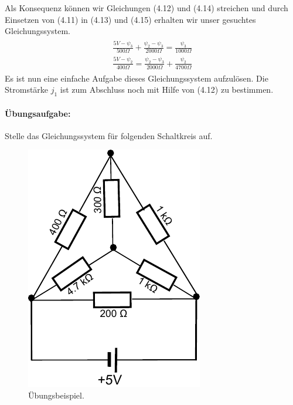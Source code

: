 \documentclass[11pt,a4paper,leqno]{report}
\numberwithin{equation}{chapter}
\begin{document}
Als Konsequenz k\"onnen wir Gleichungen (4.12) und (4.14) streichen und durch Einsetzen von (4.11) in (4.13) und (4.15) erhalten wir unser gesuchtes Gleichungssystem.
\begin{align} 
\begin{split}
\frac{5V - \psi_3}{500\Omega} + \frac{\psi_2 - \psi_3}{2000\Omega} = \frac{ \psi_3}{1000\Omega}\\
\frac{5V - \psi_2}{400\Omega} = \frac{\psi_2 - \psi_3}{2000\Omega} + \frac{ \psi_2}{4700\Omega}
\end{split}
\end{align}
Es ist nun eine einfache Aufgabe dieses Gleichungssystem aufzul\"osen. Die Stromst\"arke $j_1$ ist zum Abschluss noch mit Hilfe von (4.12) zu bestimmen.
\paragraph{\"Ubungsaufgabe:} Stelle das Gleichungssystem f\"ur folgenden Schaltkreis auf.
\begin{figure}[H]
	\begin{center}
		\includegraphics[scale=0.8]{Bilder/ub.pdf}
		\caption{\"Ubungsbeispiel.}
	\end{center}
\end{figure}
\noindent
\end{document}
